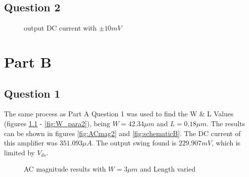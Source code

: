 \documentclass[12pt, letterpaper, notitlepage, DIV=16, BCOR=1mm, headlines=2]{scrreprt}
\begin{document}
\section*{Question 2}
\begin{figure}[h]
	\caption{output DC current with $\pm 10mV$}
	\label{fig:DCVary}
\end{figure}



\chapter{Part B}
\section*{Question 1}
The same process as Part A Question 1 was used to find the W \& L Values
(figures \ref{fig:L_para2}
 - \ref{fig:W_para2}), 
being $W = 42.34\mu m$ and $L = 0.18 \mu m$. The results can be shown in
figures \ref{fig:ACmag2}
and \ref{fig:schematicB}.
The DC current of this amplifier was $351.093\mu A$.
The output swing found is $229.907mV$, which is limited by $V_{ds}$.

\begin{figure}[h]
	\caption{AC magnitude results with $W=3\mu m$ and Length varied}
	\label{fig:L_para2}
\end{figure}
\end{document}
